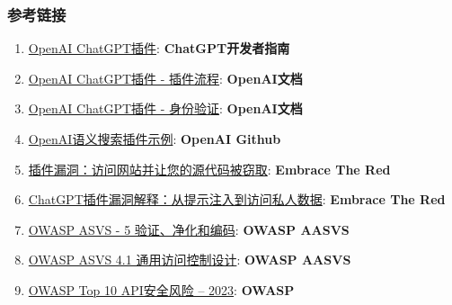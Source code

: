 \documentclass[
]{article}
\providecommand{\tightlist}{%
  \setlength{\itemsep}{0pt}\setlength{\parskip}{0pt}}
\begin{document}
\subsubsection{参考链接}\label{ux53c2ux8003ux94feux63a5}

\begin{enumerate}
\def\labelenumi{\arabic{enumi}.}
\tightlist
\item
  \href{https://platform.openai.com/docs/plugins/introduction}{OpenAI
  ChatGPT插件}: \textbf{ChatGPT开发者指南}
\item
  \href{https://platform.openai.com/docs/plugins/introduction/plugin-flow}{OpenAI
  ChatGPT插件 - 插件流程}: \textbf{OpenAI文档}
\item
  \href{https://platform.openai.com/docs/plugins/authentication/service-level}{OpenAI
  ChatGPT插件 - 身份验证}: \textbf{OpenAI文档}
\item
  \href{https://github.com/openai/chatgpt-retrieval-plugin}{OpenAI语义搜索插件示例}:
  \textbf{OpenAI Github}
\item
  \href{https://embracethered.com/blog/posts/2023/chatgpt-plugin-vulns-chat-with-code/}{插件漏洞：访问网站并让您的源代码被窃取}:
  \textbf{Embrace The Red}
\item
  \href{https://embracethered.com/blog/posts/2023/chatgpt-cross-plugin-request-forgery-and-prompt-injection./}{ChatGPT插件漏洞解释：从提示注入到访问私人数据}:
  \textbf{Embrace The Red}
\item
  \href{https://owasp-aasvs4.readthedocs.io/en/latest/V5.html\#validation-sanitization-and-encoding}{OWASP
  ASVS - 5 验证、净化和编码}: \textbf{OWASP AASVS}
\item
  \href{https://owasp-aasvs4.readthedocs.io/en/latest/V4.1.html\#general-access-control-design}{OWASP
  ASVS 4.1 通用访问控制设计}: \textbf{OWASP AASVS}
\item
  \href{https://owasp.org/API-Security/editions/2023/en/0x11-t10/}{OWASP
  Top 10 API安全风险 -- 2023}: \textbf{OWASP}
\end{enumerate}
\end{document}
